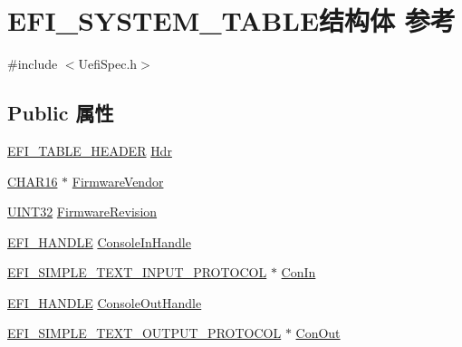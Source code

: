 \hypertarget{struct_e_f_i___s_y_s_t_e_m___t_a_b_l_e}{}\section{E\+F\+I\+\_\+\+S\+Y\+S\+T\+E\+M\+\_\+\+T\+A\+B\+L\+E结构体 参考}
\label{struct_e_f_i___s_y_s_t_e_m___t_a_b_l_e}


{\ttfamily \#include $<$Uefi\+Spec.\+h$>$}

\subsection*{Public 属性}
\begin{DoxyCompactItemize}
\item 
\hyperlink{struct_e_f_i___t_a_b_l_e___h_e_a_d_e_r}{E\+F\+I\+\_\+\+T\+A\+B\+L\+E\+\_\+\+H\+E\+A\+D\+ER} \hyperlink{struct_e_f_i___s_y_s_t_e_m___t_a_b_l_e_adb950787e9f5999127d36f53ea23649e}{Hdr}
\item 
\hyperlink{_processor_bind_8h_a7ae886893bd2a2ae253eb2b021a48724}{C\+H\+A\+R16} $\ast$ \hyperlink{struct_e_f_i___s_y_s_t_e_m___t_a_b_l_e_ac854bfc3d76bf13ee5f4701b069b5483}{Firmware\+Vendor}
\item 
\hyperlink{_processor_bind_8h_ae1e6edbbc26d6fbc71a90190d0266018}{U\+I\+N\+T32} \hyperlink{struct_e_f_i___s_y_s_t_e_m___t_a_b_l_e_a289adadc89c3c1efe7ec2e0eb8648d49}{Firmware\+Revision}
\item 
\hyperlink{_uefi_base_type_8h_af943d518ce8a229e7e51ce3fed0e3122}{E\+F\+I\+\_\+\+H\+A\+N\+D\+LE} \hyperlink{struct_e_f_i___s_y_s_t_e_m___t_a_b_l_e_a3a0560ccbc9f7bb15d1661a27039af44}{Console\+In\+Handle}
\item 
\hyperlink{struct___e_f_i___s_i_m_p_l_e___t_e_x_t___i_n_p_u_t___p_r_o_t_o_c_o_l}{E\+F\+I\+\_\+\+S\+I\+M\+P\+L\+E\+\_\+\+T\+E\+X\+T\+\_\+\+I\+N\+P\+U\+T\+\_\+\+P\+R\+O\+T\+O\+C\+OL} $\ast$ \hyperlink{struct_e_f_i___s_y_s_t_e_m___t_a_b_l_e_a8ec5a8fcfe4a78b6004ac1d584e7a58e}{Con\+In}
\item 
\hyperlink{_uefi_base_type_8h_af943d518ce8a229e7e51ce3fed0e3122}{E\+F\+I\+\_\+\+H\+A\+N\+D\+LE} \hyperlink{struct_e_f_i___s_y_s_t_e_m___t_a_b_l_e_a5a8a97eadf11e9dd811ccdd77fe65bdb}{Console\+Out\+Handle}
\item 
\hyperlink{struct___e_f_i___s_i_m_p_l_e___t_e_x_t___o_u_t_p_u_t___p_r_o_t_o_c_o_l}{E\+F\+I\+\_\+\+S\+I\+M\+P\+L\+E\+\_\+\+T\+E\+X\+T\+\_\+\+O\+U\+T\+P\+U\+T\+\_\+\+P\+R\+O\+T\+O\+C\+OL} $\ast$ \hyperlink{struct_e_f_i___s_y_s_t_e_m___t_a_b_l_e_ad463e2fce9384e0f658376b14d347bb1}{Con\+Out}

\end{DoxyCompactItemize}
